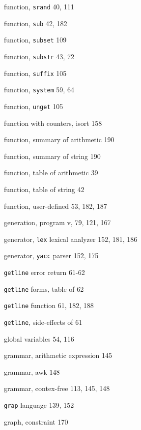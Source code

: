 \begin{multicols}{3}
\hangindent=4pc  function, \verb'srand' 40, 111

\hangindent=4pc  function, \verb'sub' 42, 182

\hangindent=4pc  function, \verb'subset' 109

\hangindent=4pc  function, \verb'substr' 43, 72

\hangindent=4pc  function, \verb'suffix' 105

\hangindent=4pc  function, \verb'system' 59, 64

\hangindent=4pc  function, \verb'unget' 105

\hangindent=4pc  function with counters, isort 158

\hangindent=4pc  function, summary of arithmetic 190

\hangindent=4pc  function, summary of string 190

\hangindent=4pc  function, table of arithmetic 39

\hangindent=4pc  function, table of string 42

\hangindent=4pc  function, user-defined 53, 182, 187

\hangindent=4pc  generation, program v, 79, 121, 167

\hangindent=4pc  generator, \verb'lex' lexical analyzer 152, 181, 186

\hangindent=4pc  generator, \verb'yacc' parser 152, 175

\hangindent=4pc  \verb'getline' error return 61-62

\hangindent=4pc  \verb'getline' forms, table of 62

\hangindent=4pc  \verb'getline' function 61, 182, 188

\hangindent=4pc  \verb'getline', side-effects of 61

\hangindent=4pc  global variables 54, 116

\hangindent=4pc  grammar, arithmetic expression 145

\hangindent=4pc  grammar, awk 148

\hangindent=4pc  grammar, contex-free 113, 145, 148

\hangindent=4pc  \verb'grap' language 139, 152

\hangindent=4pc  graph, constraint 170


\end{multicols}
